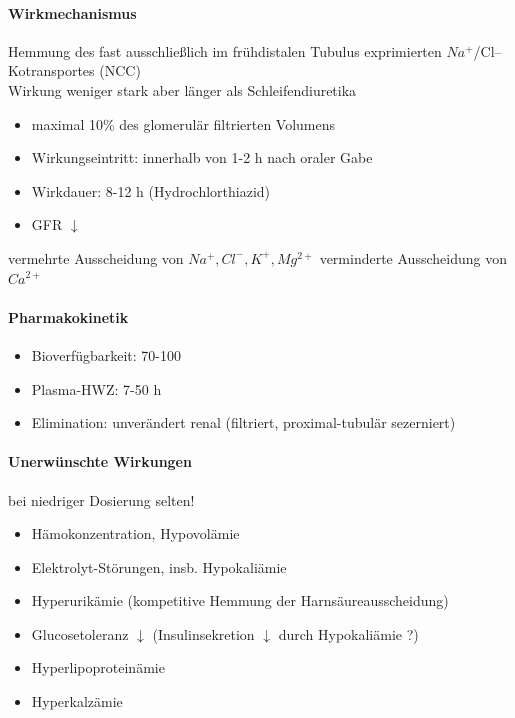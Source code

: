 \documentclass[10pt,a4paper]{report}
\begin{document}
\paragraph{Wirkmechanismus}
Hemmung des fast ausschließlich im frühdistalen Tubulus exprimierten $Na^+$/Cl--Kotransportes (NCC)\\
Wirkung weniger stark aber länger als Schleifendiuretika\\
\begin{itemize}
	\item maximal 10\% des glomerulär 	filtrierten  Volumens
	\item Wirkungseintritt: innerhalb von 1-2 h nach oraler Gabe
	\item Wirkdauer: 8-12 h (Hydrochlorthiazid) 
	\item GFR $\downarrow$ 
\end{itemize}
vermehrte Ausscheidung von $Na^+, Cl^-, K^+, Mg^{2+}$ verminderte Ausscheidung von $Ca^{2+}$
\paragraph{Pharmakokinetik}
\begin{itemize}
	\item Bioverfügbarkeit: 70-100 %
	\item Plasma-HWZ: 7-50 h
	\item Elimination: unverändert renal (filtriert, proximal-tubulär sezerniert)
\end{itemize}
\paragraph{Unerwünschte Wirkungen}
bei niedriger Dosierung selten!
\begin{itemize}
	\item Hämokonzentration, Hypovolämie
	\item Elektrolyt-Störungen, insb. Hypokaliämie
	\item Hyperurikämie (kompetitive Hemmung der Harnsäureausscheidung)
	\item Glucosetoleranz $\downarrow$ (Insulinsekretion $\downarrow$ durch Hypokaliämie ?)
	\item Hyperlipoproteinämie
	\item Hyperkalzämie
\end{itemize}
\end{document}
